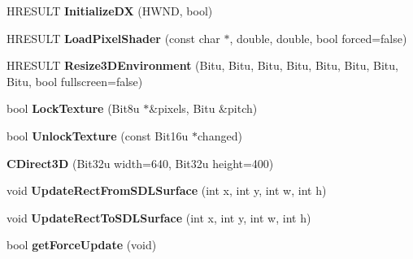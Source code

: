 \begin{DoxyCompactItemize}
\item 
\hypertarget{classCDirect3D_af7252e1b4e62fad15bd0737efaf1020b}{H\-R\-E\-S\-U\-L\-T {\bfseries Initialize\-D\-X} (H\-W\-N\-D, bool)}\label{classCDirect3D_af7252e1b4e62fad15bd0737efaf1020b}

\item 
\hypertarget{classCDirect3D_aa150a4206bea62e1db00c9a578db92d2}{H\-R\-E\-S\-U\-L\-T {\bfseries Load\-Pixel\-Shader} (const char $\ast$, double, double, bool forced=false)}\label{classCDirect3D_aa150a4206bea62e1db00c9a578db92d2}

\item 
\hypertarget{classCDirect3D_a4748ee615a630fc347fcdd12a659a34a}{H\-R\-E\-S\-U\-L\-T {\bfseries Resize3\-D\-Environment} (Bitu, Bitu, Bitu, Bitu, Bitu, Bitu, Bitu, Bitu, bool fullscreen=false)}\label{classCDirect3D_a4748ee615a630fc347fcdd12a659a34a}

\item 
\hypertarget{classCDirect3D_a812efd841357b6eb503d4a98b59dc312}{bool {\bfseries Lock\-Texture} (Bit8u $\ast$\&pixels, Bitu \&pitch)}\label{classCDirect3D_a812efd841357b6eb503d4a98b59dc312}

\item 
\hypertarget{classCDirect3D_aa96cedde54fddd444ddcc594dc5bfb7c}{bool {\bfseries Unlock\-Texture} (const Bit16u $\ast$changed)}\label{classCDirect3D_aa96cedde54fddd444ddcc594dc5bfb7c}

\item 
\hypertarget{classCDirect3D_a59d66d5473e8843da911e0c52ea77be2}{{\bfseries C\-Direct3\-D} (Bit32u width=640, Bit32u height=400)}\label{classCDirect3D_a59d66d5473e8843da911e0c52ea77be2}

\item 
\hypertarget{classCDirect3D_acc64918261bd9b867e0d3bf482359140}{void {\bfseries Update\-Rect\-From\-S\-D\-L\-Surface} (int x, int y, int w, int h)}\label{classCDirect3D_acc64918261bd9b867e0d3bf482359140}

\item 
\hypertarget{classCDirect3D_aae6929152c019a8b69afff7d8d06c847}{void {\bfseries Update\-Rect\-To\-S\-D\-L\-Surface} (int x, int y, int w, int h)}\label{classCDirect3D_aae6929152c019a8b69afff7d8d06c847}

\item 
\hypertarget{classCDirect3D_aca465f14d712de242b06a743a7cdc37b}{bool {\bfseries get\-Force\-Update} (void)}\label{classCDirect3D_aca465f14d712de242b06a743a7cdc37b}

\end{DoxyCompactItemize}
